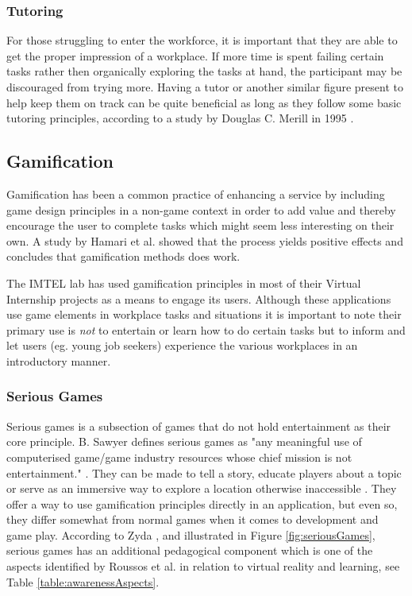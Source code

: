 \subsubsection{Tutoring}
For those struggling to enter the workforce, it is important that they are able to get the proper impression of a workplace. If more time is spent failing certain tasks rather then organically exploring the tasks at hand, the participant may be discouraged from trying more. Having a tutor or another similar figure present to help keep them on track can be quite beneficial as long as they follow some basic tutoring principles, according to a study by Douglas C. Merill in 1995 \cite{merrill1995tutoring}.

\subsection{Gamification}
\label{sec:gamification}
Gamification has been a common practice of enhancing a service by including game design principles in a non-game context in order to add value and thereby encourage the user to complete tasks which might seem less interesting on their own. A study by Hamari et al. \cite{hamari2014does} showed that the process yields positive effects and concludes that gamification methods does work.

The IMTEL lab has used gamification principles in most of their Virtual Internship projects as a means to engage its users. Although these applications use game elements in workplace tasks and situations it is important to note their primary use is \textit{not} to entertain or learn how to do certain tasks but to inform and let users (eg. young job seekers) experience the various workplaces in an introductory manner.      

\subsubsection{Serious Games}
Serious games is a subsection of games that do not hold entertainment as their core principle. B. Sawyer defines serious games as "any meaningful use of computerised game/game industry resources whose chief mission is not entertainment." \cite{sawyer2007serious}.
They can be made to tell a story, educate players about a topic or serve as an immersive way to explore a location otherwise inaccessible \cite{susi2007serious}. They offer a way to use gamification principles directly in an application, but even so, they differ somewhat from normal games when it comes to development and game play. According to Zyda \cite{zyda2005visual}, and illustrated in Figure \ref{fig:seriousGames}, serious games has an additional pedagogical component which is one of the aspects identified by Roussos et al. in relation to virtual reality and learning, see Table \ref{table:awarenessAspects}.   

